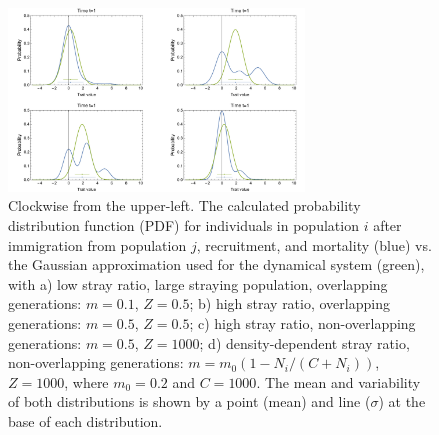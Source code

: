 \documentclass{revtex4}
\begin{document}
\begin{figure}
  \captionsetup{justification=raggedright,
singlelinecheck=false
}
\centering
\includegraphics[width=0.7\textwidth]{fig_PDF.pdf}
\caption{
Clockwise from the upper-left. The calculated probability distribution function (PDF) for individuals in population $i$ after immigration from population $j$, recruitment, and mortality (blue) vs. the Gaussian approximation used for the dynamical system (green), with
a) low stray ratio, large straying population, overlapping generations: $m=0.1$, $Z=0.5$;
b) high stray ratio, overlapping generations: $m=0.5$, $Z=0.5$;
c) high stray ratio, non-overlapping generations: $m=0.5$, $Z=1000$;
d) density-dependent stray ratio, non-overlapping generations: $m=m_0(1-N_i/(C+N_i))$, $Z=1000$, where $m_0=0.2$ and $C=1000$.
The mean and variability of both distributions is shown by a point (mean) and line ($\sigma$) at the base of each distribution.
} \label{fig:PDF}
\end{figure}
\end{document}
